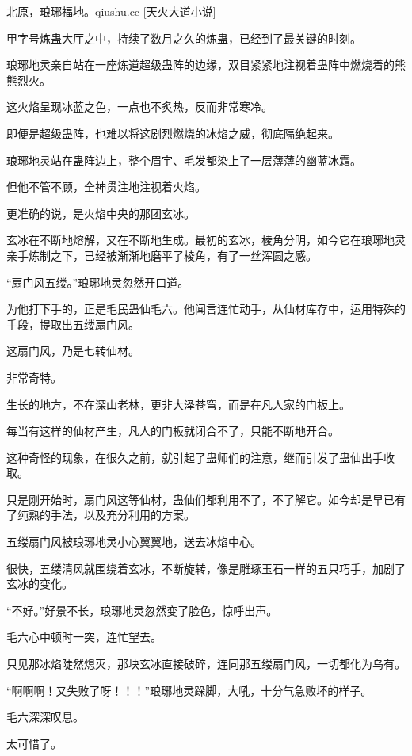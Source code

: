 
\begin{this_body}

北原，琅琊福地。qiushu.cc [天火大道小说]

甲字号炼蛊大厅之中，持续了数月之久的炼蛊，已经到了最关键的时刻。

琅琊地灵亲自站在一座炼道超级蛊阵的边缘，双目紧紧地注视着蛊阵中燃烧着的熊熊烈火。

这火焰呈现冰蓝之色，一点也不炙热，反而非常寒冷。

即便是超级蛊阵，也难以将这剧烈燃烧的冰焰之威，彻底隔绝起来。

琅琊地灵站在蛊阵边上，整个眉宇、毛发都染上了一层薄薄的幽蓝冰霜。

但他不管不顾，全神贯注地注视着火焰。

更准确的说，是火焰中央的那团玄冰。

玄冰在不断地熔解，又在不断地生成。最初的玄冰，棱角分明，如今它在琅琊地灵亲手炼制之下，已经被渐渐地磨平了棱角，有了一丝浑圆之感。

“扇门风五缕。”琅琊地灵忽然开口道。

为他打下手的，正是毛民蛊仙毛六。他闻言连忙动手，从仙材库存中，运用特殊的手段，提取出五缕扇门风。

这扇门风，乃是七转仙材。

非常奇特。

生长的地方，不在深山老林，更非大泽苍穹，而是在凡人家的门板上。

每当有这样的仙材产生，凡人的门板就闭合不了，只能不断地开合。

这种奇怪的现象，在很久之前，就引起了蛊师们的注意，继而引发了蛊仙出手收取。

只是刚开始时，扇门风这等仙材，蛊仙们都利用不了，不了解它。如今却是早已有了纯熟的手法，以及充分利用的方案。

五缕扇门风被琅琊地灵小心翼翼地，送去冰焰中心。

很快，五缕清风就围绕着玄冰，不断旋转，像是雕琢玉石一样的五只巧手，加剧了玄冰的变化。

“不好。”好景不长，琅琊地灵忽然变了脸色，惊呼出声。

毛六心中顿时一突，连忙望去。

只见那冰焰陡然熄灭，那块玄冰直接破碎，连同那五缕扇门风，一切都化为乌有。

“啊啊啊！又失败了呀！！！”琅琊地灵跺脚，大吼，十分气急败坏的样子。

毛六深深叹息。

太可惜了。


\end{this_body}
